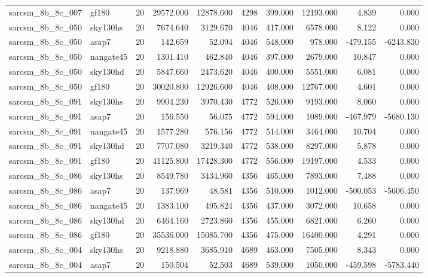 \begin{longtable}{llrrrrrrrr}
sarcsm\_8b\_8c\_007 & gf180 & 20 & 29572.000 & 12878.600 & 4298 & 399.000 & 12193.000 & 4.839 & 0.000 \\
sarcsm\_8b\_8c\_050 & sky130hs & 20 & 7674.640 & 3129.670 & 4046 & 417.000 & 6578.000 & 8.122 & 0.000 \\
sarcsm\_8b\_8c\_050 & asap7 & 20 & 142.659 & 52.094 & 4046 & 548.000 & 978.000 & -479.155 & -6243.830 \\
sarcsm\_8b\_8c\_050 & nangate45 & 20 & 1301.410 & 462.840 & 4046 & 397.000 & 2679.000 & 10.847 & 0.000 \\
sarcsm\_8b\_8c\_050 & sky130hd & 20 & 5847.660 & 2473.620 & 4046 & 400.000 & 5551.000 & 6.081 & 0.000 \\
sarcsm\_8b\_8c\_050 & gf180 & 20 & 30020.800 & 12926.600 & 4046 & 408.000 & 12767.000 & 4.601 & 0.000 \\
sarcsm\_8b\_8c\_091 & sky130hs & 20 & 9904.230 & 3970.430 & 4772 & 526.000 & 9193.000 & 8.060 & 0.000 \\
sarcsm\_8b\_8c\_091 & asap7 & 20 & 156.550 & 56.075 & 4772 & 594.000 & 1089.000 & -467.979 & -5680.130 \\
sarcsm\_8b\_8c\_091 & nangate45 & 20 & 1577.280 & 576.156 & 4772 & 514.000 & 3464.000 & 10.704 & 0.000 \\
sarcsm\_8b\_8c\_091 & sky130hd & 20 & 7707.080 & 3219.340 & 4772 & 538.000 & 8297.000 & 5.878 & 0.000 \\
sarcsm\_8b\_8c\_091 & gf180 & 20 & 41125.800 & 17428.300 & 4772 & 556.000 & 19197.000 & 4.533 & 0.000 \\
sarcsm\_8b\_8c\_086 & sky130hs & 20 & 8549.780 & 3434.960 & 4356 & 465.000 & 7893.000 & 7.488 & 0.000 \\
sarcsm\_8b\_8c\_086 & asap7 & 20 & 137.969 & 48.581 & 4356 & 510.000 & 1012.000 & -500.053 & -5606.450 \\
sarcsm\_8b\_8c\_086 & nangate45 & 20 & 1383.100 & 495.824 & 4356 & 437.000 & 3072.000 & 10.658 & 0.000 \\
sarcsm\_8b\_8c\_086 & sky130hd & 20 & 6464.160 & 2723.860 & 4356 & 455.000 & 6821.000 & 6.260 & 0.000 \\
sarcsm\_8b\_8c\_086 & gf180 & 20 & 35536.000 & 15085.700 & 4356 & 475.000 & 16400.000 & 4.291 & 0.000 \\
sarcsm\_8b\_8c\_004 & sky130hs & 20 & 9218.880 & 3685.910 & 4689 & 463.000 & 7505.000 & 8.343 & 0.000 \\
sarcsm\_8b\_8c\_004 & asap7 & 20 & 150.504 & 52.503 & 4689 & 539.000 & 1050.000 & -459.598 & -5783.440 \\

\end{longtable}
